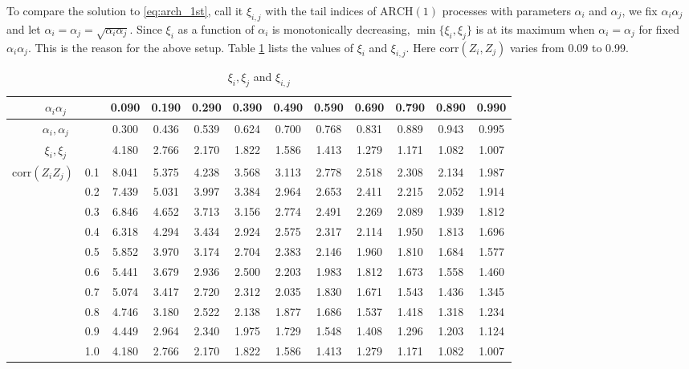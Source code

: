 \documentclass{article}
\begin{document}
To compare the solution to \eqref{eq:arch_1st}, call it $\xi_{i,j}$
with the tail indices of $\text{ARCH}(1)$ processes with parameters
$\alpha_i$ and $\alpha_j$, we fix $\alpha_i \alpha_j$ and let
$\alpha_i = \alpha_j = \sqrt{\alpha_i \alpha_j}$. Since $\xi_i$ as a
function of $\alpha_i$ is monotonically decreasing, $\min\{\xi_i,
\xi_j\}$ is at its maximum when $\alpha_i = \alpha_j$ for fixed
$\alpha_i \alpha_j$. This is the reason for the above setup. Table
\ref{tab:tail_indices_normal} lists the values of $\xi_i$ and
$\xi_{i,j}$. Here $\text{corr}(Z_i, Z_j)$ varies from 0.09 to 0.99.
\begin{table}[htb!]
  \centering
  \begin{scriptsize}
  \begin{tabular}{c|c|cccccccccc}
    \multicolumn{2}{c|}{$\alpha_i \alpha_j$} & 0.090 & 0.190 & 0.290 &
    0.390 & 0.490 & 0.590 & 0.690 & 0.790 & 0.890 & 0.990 \\
    \hline
    \multicolumn{2}{c|}{$\alpha_i, \alpha_j$} & 0.300 & 0.436 & 0.539 &
    0.624 & 0.700 & 0.768 & 0.831 & 0.889 & 0.943 & 0.995 \\
    \hline
    \multicolumn{2}{c|}{$\xi_i, \xi_j$} & 4.180 & 2.766 & 2.170 &
    1.822 & 1.586 & 1.413 & 1.279 & 1.171 & 1.082 & 1.007 \\
    \hline
    \multirow{10}{*}{$\text{corr}(Z_i Z_j)$} & 0.1 & 8.041 & 5.375 &
    4.238 & 3.568 &
    3.113 & 2.778 & 2.518 & 2.308 & 2.134 & 1.987 \\
    & 0.2 & 7.439 & 5.031 & 3.997 & 3.384 & 2.964 &
    2.653 & 2.411 & 2.215 & 2.052 & 1.914 \\
    & 0.3 & 6.846 & 4.652 & 3.713 & 3.156 &
    2.774 & 2.491 & 2.269 & 2.089 & 1.939 & 1.812 \\
    & 0.4 & 6.318 & 4.294 & 3.434 & 2.924 &
    2.575 & 2.317 & 2.114 & 1.950 & 1.813 & 1.696 \\
    & 0.5 & 5.852 & 3.970 & 3.174 & 2.704 &
    2.383 & 2.146 & 1.960 & 1.810 & 1.684 & 1.577 \\
    & 0.6 & 5.441 & 3.679 & 2.936 & 2.500 &
    2.203 & 1.983 & 1.812 & 1.673 & 1.558 & 1.460 \\
    & 0.7 & 5.074 & 3.417 & 2.720 & 2.312 &
    2.035 & 1.830 & 1.671 & 1.543 & 1.436 & 1.345 \\
    & 0.8 & 4.746 & 3.180 & 2.522 & 2.138 &
    1.877 & 1.686 & 1.537 & 1.418 & 1.318 & 1.234 \\
    & 0.9 & 4.449 & 2.964 & 2.340 & 1.975 &
    1.729 & 1.548 & 1.408 & 1.296 & 1.203 & 1.124 \\
    & 1.0 & 4.180 & 2.766 & 2.170 & 1.822 &
    1.586 & 1.413 & 1.279 & 1.171 & 1.082 & 1.007
  \end{tabular}
  \end{scriptsize}
  \caption{$\xi_i, \xi_j$ and $\xi_{i,j}$}
  \label{tab:tail_indices_normal}
\end{table}
\end{document}
